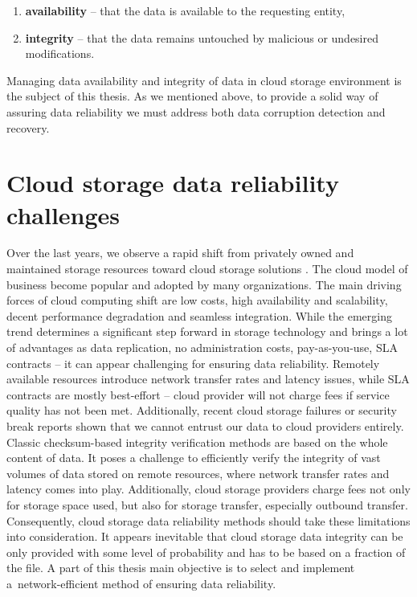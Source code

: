 \begin{enumerate}
\item \textbf{availability} -- that the data is available to the requesting entity,
\item \textbf{integrity} -- that the data remains untouched by malicious or undesired
modifications.
\end{enumerate}

Managing data availability and integrity of data in cloud storage environment is the
subject of this thesis. As we mentioned above, to provide a solid way of assuring data
reliability we must address both data corruption detection and recovery.

\section{Cloud storage data reliability challenges}

Over the last years, we observe a rapid shift from privately owned and maintained
storage resources toward cloud storage solutions \cite{cisco-cloud-shift}. The cloud model of business become
popular and adopted by many organizations. The main driving forces of cloud computing
shift are low costs, high availability and scalability, decent performance degradation
and seamless integration. While the emerging trend determines a significant step forward 
in storage technology and brings a lot of advantages as data replication, no administration
costs, pay-as-you-use, SLA contracts -- it can appear challenging for ensuring data 
reliability. Remotely available resources introduce network transfer rates and latency issues,
while SLA contracts are mostly best-effort -- cloud provider will not charge fees if service
quality has not been met. Additionally, recent cloud storage failures or security break
reports shown that we cannot entrust our data to cloud providers entirely.\\
 
Classic checksum-based integrity verification methods are based on the whole content of data. It
poses a challenge to efficiently verify the integrity of vast volumes of data stored on remote resources,
where network transfer rates and latency comes into play. Additionally, cloud
storage providers charge fees not only for storage space used, but also for storage transfer, especially outbound transfer.
Consequently, cloud storage data reliability methods should take these limitations into
consideration. It appears inevitable that cloud storage data integrity can be only provided with
some level of probability and has to be based on a fraction of the file. A part of this thesis main
objective is to select and implement a~network-efficient method of ensuring data reliability.


